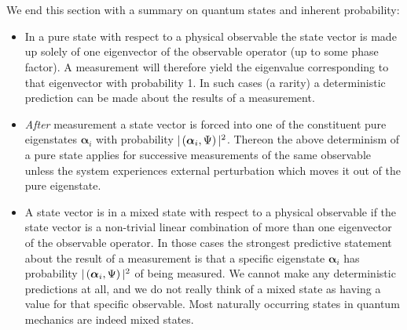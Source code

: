 \\\\
We end this section with a summary on quantum states and inherent probability:
\begin{itemize}
    \item In a pure state with respect to a physical observable the state vector is made up solely of one eigenvector of the observable operator (up to some phase factor). A measurement will therefore yield the eigenvalue corresponding to that eigenvector with probability 1. In such cases (a rarity) a deterministic prediction can be made about the results of a measurement.
    \item \textit{After} measurement a state vector is forced into one of the constituent pure eigenstates $\bm{\alpha}_{i}$ with probability $|\left(\bm{\alpha}_{i},\Psi\right)|^2$. Thereon the above determinism of a pure state applies for successive measurements of the same observable unless the system experiences external perturbation which moves it out of the pure eigenstate.
    \item A state vector is in a mixed state with respect to a physical observable if the state vector is a non-trivial linear combination of more than one eigenvector of the observable operator. In those cases the strongest predictive statement about the result of a measurement is that a specific eigenstate $\bm{\alpha}_{i}$ has probability $|\left(\bm{\alpha}_{i},\Psi\right)|^2$ of being measured. We cannot make any deterministic predictions at all, and we do not really think of a mixed state as having a value for that specific observable. Most naturally occurring states in quantum mechanics are indeed mixed states.
\end{itemize}
